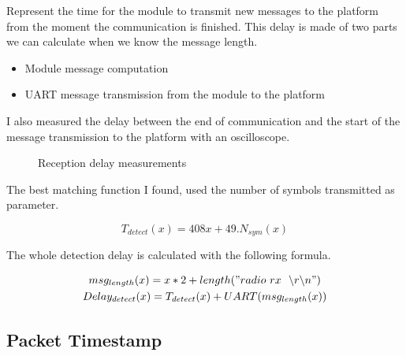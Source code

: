 Represent the time for the module to transmit new messages to the platform
from the moment the communication is finished.
This delay is made of two parts we can calculate when we know the message
length.

\begin{itemize}
  \item Module message computation
  \item UART message transmission from the module to the platform
\end{itemize}

I also measured the delay between the end of communication and the start of the
message transmission to the platform with an oscilloscope.

\begin{figure}[H]
  \centering
  \caption{Reception delay measurements\label{fig:transmissiondelay}}
\end{figure}

The best matching function I found, used the number of symbols transmitted as
parameter.

\begin{equation}
  \label{eq:detectcomp}
  T_{detect}(x) = 408x + 49 . N_{sym}(x)
\end{equation}

The whole detection delay is calculated with the following formula.

\begin{gather}
  msg_{length}(x) = x * 2 + length("radio~rx~~\backslash r \backslash n") \\
  \label{eq:detectdelay}
  Delay_{detect}(x) = T_{detect}(x) + UART(msg_{length}(x))
\end{gather}

\subsection{Packet Timestamp}

